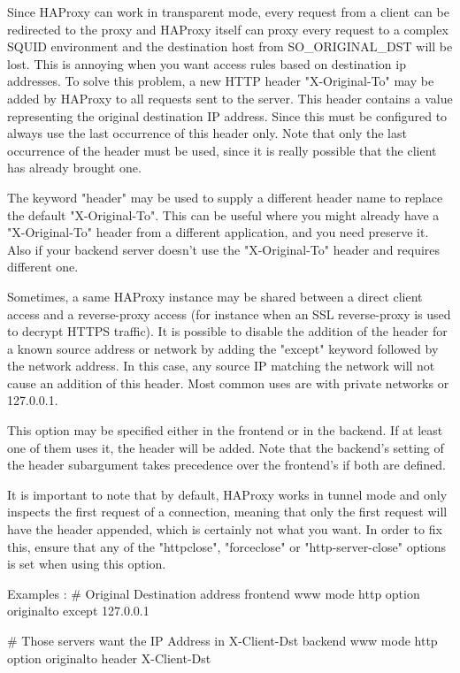   Since HAProxy can work in transparent mode, every request from a client can
  be redirected to the proxy and HAProxy itself can proxy every request to a
  complex SQUID environment and the destination host from SO_ORIGINAL_DST will
  be lost. This is annoying when you want access rules based on destination ip
  addresses. To solve this problem, a new HTTP header "X-Original-To" may be
  added by HAProxy to all requests sent to the server. This header contains a
  value representing the original destination IP address. Since this must be
  configured to always use the last occurrence of this header only. Note that
  only the last occurrence of the header must be used, since it is really
  possible that the client has already brought one.

  The keyword "header" may be used to supply a different header name to replace
  the default "X-Original-To". This can be useful where you might already
  have a "X-Original-To" header from a different application, and you need
  preserve it. Also if your backend server doesn't use the "X-Original-To"
  header and requires different one.

  Sometimes, a same HAProxy instance may be shared between a direct client
  access and a reverse-proxy access (for instance when an SSL reverse-proxy is
  used to decrypt HTTPS traffic). It is possible to disable the addition of the
  header for a known source address or network by adding the "except" keyword
  followed by the network address. In this case, any source IP matching the
  network will not cause an addition of this header. Most common uses are with
  private networks or 127.0.0.1.

  This option may be specified either in the frontend or in the backend. If at
  least one of them uses it, the header will be added. Note that the backend's
  setting of the header subargument takes precedence over the frontend's if
  both are defined.

  It is important to note that by default, HAProxy works in tunnel mode and
  only inspects the first request of a connection, meaning that only the first
  request will have the header appended, which is certainly not what you want.
  In order to fix this, ensure that any of the "httpclose", "forceclose" or
  "http-server-close" options is set when using this option.

  Examples :
    # Original Destination address
    frontend www
        mode http
        option originalto except 127.0.0.1

    # Those servers want the IP Address in X-Client-Dst
    backend www
        mode http
        option originalto header X-Client-Dst

